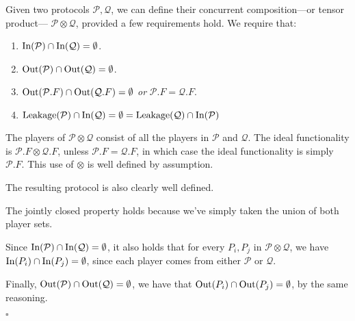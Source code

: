 \begin{definition}
Given two protocols $\mathcal{P}, \mathcal{Q}$,
we can define their concurrent composition---or tensor product---
$\mathcal{P} \otimes \mathcal{Q}$, provided a few requirements hold.
We require that:
\begin{enumerate}
\item $\text{In}(\mathcal{P}) \cap \text{In}(\mathcal{Q}) = \emptyset$.
\item $\text{Out}(\mathcal{P}) \cap \text{Out}(\mathcal{Q}) = \emptyset$.
\item $\text{Out}(\mathcal{P}.F) \cap \text{Out}(\mathcal{Q}.F) = \emptyset$ \emph{or} $\mathcal{P}.F = \mathcal{Q}.F$.
\item $\text{Leakage}(\mathcal{P}) \cap \text{In}(\mathcal{Q}) = \emptyset = \text{Leakage}(\mathcal{Q}) \cap \text{In}(\mathcal{P})$
\end{enumerate}

The players of $\mathcal{P} \otimes \mathcal{Q}$ consist of all the players
in $\mathcal{P}$ and $\mathcal{Q}$.
The ideal functionality is $\mathcal{P}.F \otimes \mathcal{Q}.F$, 
unless $\mathcal{P}.F = \mathcal{Q}.F$, in which case the ideal functionality
is simply $\mathcal{P}.F$.
This use of $\otimes$ is well defined by assumption.

The resulting protocol is also clearly well defined.

The jointly closed property holds because we've simply taken the union
of both player sets.

Since $\text{In}(\mathcal{P}) \cap \text{In}(\mathcal{Q}) = \emptyset$,
it also holds that for every $P_i, P_j$ in $\mathcal{P} \otimes \mathcal{Q}$,
we have $\text{In}(P_i) \cap \text{In}(P_j) = \emptyset$,
since each player comes from either $\mathcal{P}$ or $\mathcal{Q}$.
      
Finally, $\text{Out}(\mathcal{P}) \cap \text{Out}(\mathcal{Q}) = \emptyset$,
we have that $\text{Out}(P_i) \cap \text{Out}(P_j) = \emptyset$,
by the same reasoning.
    
$\square$
\end{definition}


